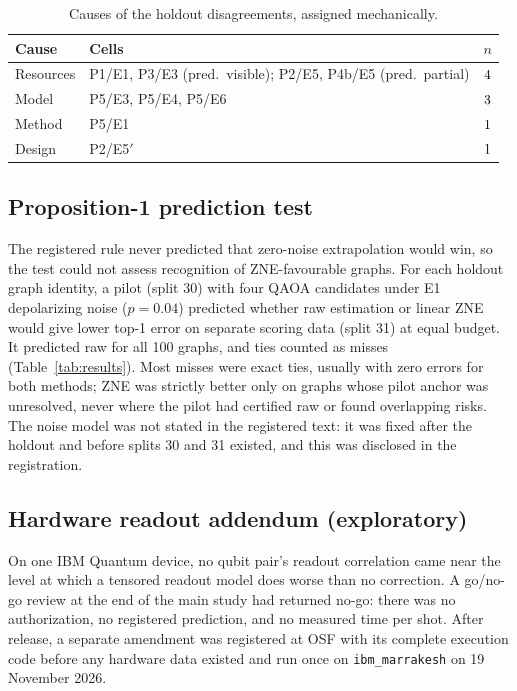 \documentclass[10pt,twocolumn]{article}
\newcommand{\code}[1]{\texttt{#1}}
\begin{document}
\begin{table}[t]
\centering
\caption{Causes of the holdout disagreements, assigned mechanically.}
\label{tab:causes}
\small
\begin{tabularx}{\columnwidth}{@{}lXr@{}}
\toprule
Cause & Cells & $n$ \\
\midrule
Resources & P1/E1, P3/E3 (pred.\ visible); P2/E5, P4b/E5 (pred.\ partial) & $4$ \\
Model & P5/E3, P5/E4, P5/E6 & $3$ \\
Method & P5/E1 & $1$ \\
Design & P2/E5$'$ & $1$ \\
\bottomrule
\end{tabularx}
\end{table}

\subsection{Proposition-1 prediction test}

The registered rule never predicted that zero-noise extrapolation would win,
so the test could not assess recognition of ZNE-favourable graphs. For each
holdout graph identity, a pilot (split 30) with four QAOA candidates under E1
depolarizing noise ($p=0.04$) predicted whether raw estimation or linear ZNE
would give lower top-1 error on separate scoring data (split 31) at equal
budget. It predicted raw for all 100 graphs, and ties counted as misses
(Table~\ref{tab:results}). Most misses were exact ties, usually with zero
errors for both methods; ZNE was strictly better only on graphs whose pilot
anchor was unresolved, never where the pilot had certified raw or found
overlapping risks. The noise model was not stated in the registered text: it
was fixed after the holdout and before splits 30 and 31 existed, and this was
disclosed in the registration.

\subsection{Hardware readout addendum (exploratory)}\label{sec:hwadd}

On one IBM Quantum device, no qubit pair's readout correlation came near the
level at which a tensored readout model does worse than no correction. A
go/no-go review at the end of the main study had returned no-go: there was no
authorization, no registered prediction, and no measured time per shot. After
release, a separate amendment was registered at OSF with its complete execution
code before any hardware data existed and run once on \code{ibm\_marrakesh}
on 19 November 2026.
\end{document}
